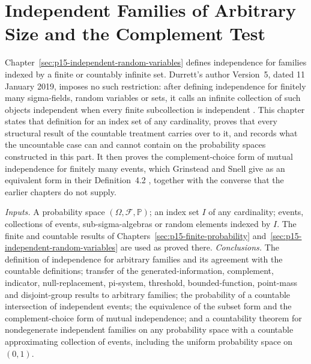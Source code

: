 \chapter{Independent Families of Arbitrary Size and the Complement Test}
\label{sec:p15-w02b-p15-006-arbitrary-independence}

Chapter~\ref{sec:p15-independent-random-variables} defines independence
for families indexed by a finite or countably infinite set. Durrett's
author Version~5, dated 11 January 2019, imposes no such restriction:
after defining independence for finitely many sigma-fields, random
variables or sets, it calls an infinite collection of such objects
independent when every finite subcollection is independent
\cite[p.~44]{DurrettPTEAuthor2019}. This chapter states that definition
for an index set of any cardinality, proves that every structural result
of the countable treatment carries over to it, and records what the
uncountable case can and cannot contain on the probability spaces
constructed in this part. It then proves the complement-choice form of
mutual independence for finitely many events, which Grinstead and Snell
give as an equivalent form in their Definition~4.2
\cite[sec.~4.1, p.~141]{GrinsteadSnellChance2006}, together with the
converse that the earlier chapters do not supply.

\emph{Inputs.} A probability space \((\Omega,\mathcal F,\mathbb P)\);
an index set \(I\) of any cardinality; events, collections of events,
sub-sigma-algebras or random elements indexed by \(I\). The finite and
countable results of Chapters~\ref{sec:p15-finite-probability}
and~\ref{sec:p15-independent-random-variables} are used as proved there.
\emph{Conclusions.} The definition of independence for arbitrary
families and its agreement with the countable definitions; transfer of
the generated-information, complement, indicator, null-replacement,
pi-system, threshold, bounded-function, point-mass and disjoint-group results to
arbitrary families; the probability of a countable intersection of
independent events; the equivalence of the subset form and the
complement-choice form of mutual independence; and a countability
theorem for nondegenerate independent families on any probability space
with a countable approximating collection of events, including the
uniform probability space on \((0,1)\).

